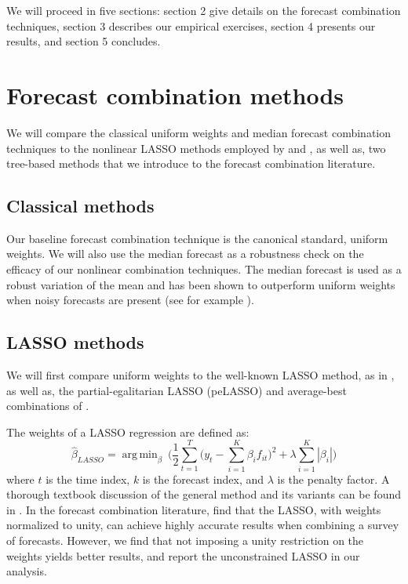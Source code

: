 \documentclass[12pt]{article}
\DeclareMathOperator*{\argmin}{arg\,min} %
\begin{document}
We will proceed in five sections: section 2 give details on the forecast combination techniques, section 3 describes our empirical exercises, section 4 presents our results, and section 5 concludes.

\section{ Forecast combination methods}
We will compare the classical uniform weights and median forecast combination techniques to the nonlinear LASSO methods employed by \cite{Conflitti2015} and \cite{DieboldShin2019}, as well as, two tree-based methods that we introduce to the forecast combination literature. 

\subsection{Classical methods}
Our baseline forecast combination technique is the canonical standard, uniform weights. We will also use the median forecast as a robustness check on the efficacy of our nonlinear combination techniques. The median forecast is used as a robust variation of the mean and has been shown to outperform uniform weights when noisy forecasts are present (see for example \cite{GKMT2013}).

\subsection{LASSO methods}
We will first compare uniform weights to the well-known LASSO method, as in \cite{Conflitti2015}, as well as, the partial-egalitarian LASSO (peLASSO) and average-best combinations of \citet{DieboldShin2019}. 

The weights of a LASSO regression are defined as:
$$ \hat{\beta}_{LASSO} = \argmin_\beta\  \bigg(\frac{1}{2}\sum^{T}_{t = 1} \bigg(y_t - \sum^{K}_{i = 1} \beta_i f_{it}\bigg)^2 + \lambda \sum^{K}_{i = 1} |\beta_i| \bigg)$$ where $t$ is the time index, $k$ is the forecast index, and $\lambda$ is the penalty factor. A thorough textbook discussion of the general method and its variants can be found in \cite{ElementsOfStatisticalLearning}. In the forecast combination literature, \cite{Conflitti2015} find that the LASSO, with weights normalized to unity, can achieve highly accurate results when combining a survey of forecasts. However, we find that not imposing a unity restriction on the weights yields better results, and report the unconstrained LASSO in our analysis.   
\end{document}
